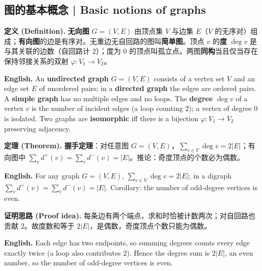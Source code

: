 \documentclass[UTF8,11pt,a4paper]{ctexart}
\newcommand{\EN}[1]{\par\noindent \textbf{English.} #1\par}
\newcommand{\DEF}[2]{\par\noindent\textbf{定义 (Definition).} #1\par\EN{#2}}
\newcommand{\THM}[2]{\par\noindent\textbf{定理 (Theorem).} #1\par\EN{#2}}
\newcommand{\PRF}[2]{\par\noindent\textbf{证明思路 (Proof idea).} #1\par\EN{#2}}
\begin{document}
\subsection{图的基本概念 | Basic notions of graphs}
\DEF{\textbf{无向图} $G=(V,E)$ 由顶点集 $V$ 与边集 $E$（$V$ 的无序对）组成；\textbf{有向图}的边是有序对。无重边无自回路的图叫\textbf{简单图}。顶点 $v$ 的\textbf{度} $\deg v$ 是与其关联的边数（自回路计 $2$）；度为 $0$ 的顶点叫孤立点。两图\textbf{同构}当且仅当存在保持邻接关系的双射 $\varphi:V_1\to V_2$。}{An \textbf{undirected graph} $G=(V,E)$ consists of a vertex set $V$ and an edge set $E$ of unordered pairs; in a \textbf{directed graph} the edges are ordered pairs. A \textbf{simple graph} has no multiple edges and no loops. The \textbf{degree} $\deg v$ of a vertex $v$ is the number of incident edges (a loop counting $2$); a vertex of degree $0$ is isolated. Two graphs are \textbf{isomorphic} iff there is a bijection $\varphi:V_1\to V_2$ preserving adjacency.}
\THM{\textbf{握手定理}：对任意图 $G=(V,E)$，$\sum_{v\in V}\deg v=2|E|$；有向图中 $\sum_v d^+(v)=\sum_v d^-(v)=|E|$。推论：奇度顶点的个数必为偶数。}{For any graph $G=(V,E)$, $\sum_{v\in V}\deg v=2|E|$; in a digraph $\sum_v d^+(v)=\sum_v d^-(v)=|E|$. Corollary: the number of odd-degree vertices is even.}
\PRF{每条边有两个端点，求和时恰被计数两次；对自回路也贡献 $2$。故度数和等于 $2|E|$，是偶数，奇度顶点个数只能为偶数。}{Each edge has two endpoints, so summing degrees counts every edge exactly twice (a loop also contributes $2$). Hence the degree sum is $2|E|$, an even number, so the number of odd-degree vertices is even.}
\end{document}
